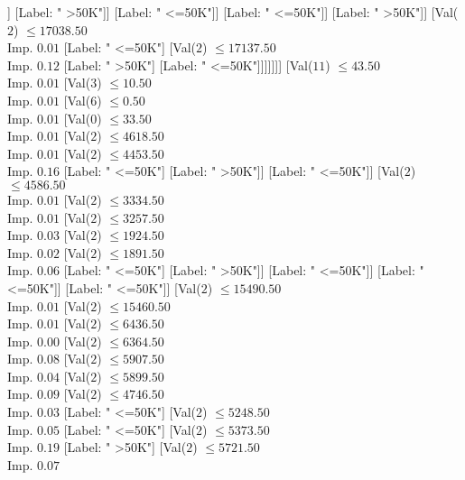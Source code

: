 \documentclass[margin=10pt]{standalone}
\begin{document}
\begin{forest}
													[Label: " <=50K"]]
												[Label: " >50K"]]
											[Label: " <=50K"]]
										[Label: " <=50K"]]
									[Label: " >50K"]]
								[Val($2$) $ \leq 17038.50$ \\ Imp. $0.01$
									[Label: " <=50K"]
									[Val($2$) $ \leq 17137.50$ \\ Imp. $0.12$
										[Label: " >50K"]
										[Label: " <=50K"]]]]]]]
				[Val($11$) $ \leq 43.50$ \\ Imp. $0.01$
					[Val($3$) $ \leq 10.50$ \\ Imp. $0.01$
						[Val($6$) $ \leq 0.50$ \\ Imp. $0.01$
							[Val($0$) $ \leq 33.50$ \\ Imp. $0.01$
								[Val($2$) $ \leq 4618.50$ \\ Imp. $0.01$
									[Val($2$) $ \leq 4453.50$ \\ Imp. $0.16$
										[Label: " <=50K"]
										[Label: " >50K"]]
									[Label: " <=50K"]]
								[Val($2$) $ \leq 4586.50$ \\ Imp. $0.01$
									[Val($2$) $ \leq 3334.50$ \\ Imp. $0.01$
										[Val($2$) $ \leq 3257.50$ \\ Imp. $0.03$
											[Val($2$) $ \leq 1924.50$ \\ Imp. $0.02$
												[Val($2$) $ \leq 1891.50$ \\ Imp. $0.06$
													[Label: " <=50K"]
													[Label: " >50K"]]
												[Label: " <=50K"]]
											[Label: " <=50K"]]
										[Label: " <=50K"]]
									[Val($2$) $ \leq 15490.50$ \\ Imp. $0.01$
										[Val($2$) $ \leq 15460.50$ \\ Imp. $0.01$
											[Val($2$) $ \leq 6436.50$ \\ Imp. $0.00$
												[Val($2$) $ \leq 6364.50$ \\ Imp. $0.08$
													[Val($2$) $ \leq 5907.50$ \\ Imp. $0.04$
														[Val($2$) $ \leq 5899.50$ \\ Imp. $0.09$
															[Val($2$) $ \leq 4746.50$ \\ Imp. $0.03$
																[Label: " <=50K"]
																[Val($2$) $ \leq 5248.50$ \\ Imp. $0.05$
																	[Label: " <=50K"]
																	[Val($2$) $ \leq 5373.50$ \\ Imp. $0.19$
																		[Label: " >50K"]
																		[Val($2$) $ \leq 5721.50$ \\ Imp. $0.07$

\end{forest}
\end{document}

